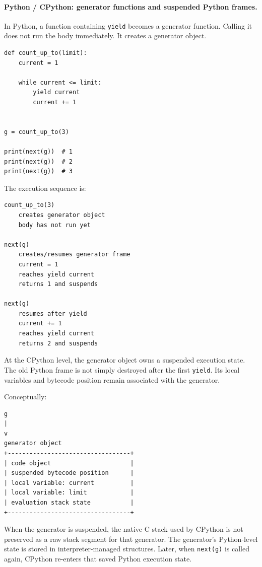 \paragraph{Python / CPython: generator functions and suspended Python frames.}

In Python, a function containing \texttt{yield} becomes a generator function. Calling it does not run the body immediately. It creates a generator object.

\begin{verbatim}
def count_up_to(limit):
    current = 1

    while current <= limit:
        yield current
        current += 1


g = count_up_to(3)

print(next(g))  # 1
print(next(g))  # 2
print(next(g))  # 3
\end{verbatim}

The execution sequence is:

\begin{verbatim}
count_up_to(3)
    creates generator object
    body has not run yet

next(g)
    creates/resumes generator frame
    current = 1
    reaches yield current
    returns 1 and suspends

next(g)
    resumes after yield
    current += 1
    reaches yield current
    returns 2 and suspends
\end{verbatim}

At the CPython level, the generator object owns a suspended execution state. The old Python frame is not simply destroyed after the first \texttt{yield}. Its local variables and bytecode position remain associated with the generator.

Conceptually:

\begin{verbatim}
g
|
v
generator object
+----------------------------------+
| code object                      |
| suspended bytecode position      |
| local variable: current          |
| local variable: limit            |
| evaluation stack state           |
+----------------------------------+
\end{verbatim}

When the generator is suspended, the native C stack used by CPython is not preserved as a raw stack segment for that generator. The generator's Python-level state is stored in interpreter-managed structures. Later, when \texttt{next(g)} is called again, CPython re-enters that saved Python execution state.


